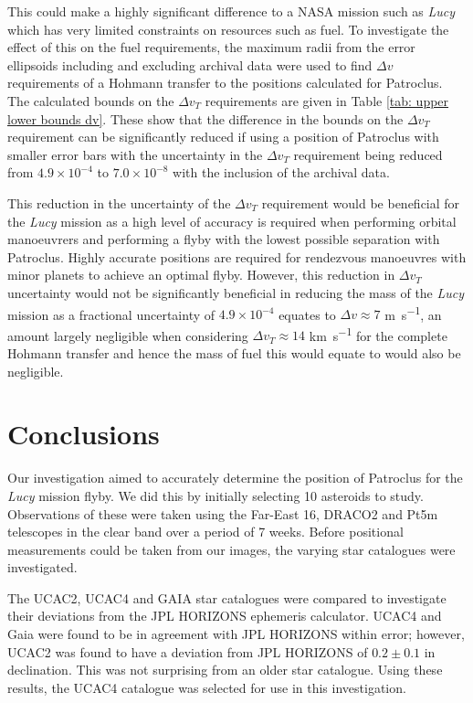 \documentclass[10pt, twocolumn]{revtex4}    %
\newcommand{\Lucy}{\textit{Lucy }}
\begin{document}
This could make a highly significant difference to a NASA mission such as \textit{Lucy} which has very limited constraints on resources such as fuel. To investigate the effect of this on the fuel requirements, the maximum radii from the error ellipsoids including and excluding archival data were used to find $\Delta v$ requirements of a Hohmann transfer to the positions calculated for Patroclus. The calculated bounds on the $\Delta v_{T}$ requirements are given in Table \ref{tab: upper lower bounds dv}. These show that the difference in the bounds on the $\Delta v_{T}$ requirement can be significantly reduced if using a position of Patroclus with smaller error bars with the uncertainty in the $\Delta v_{T}$ requirement being reduced from $4.9 \times 10^{-4}$ to $7.0 \times 10^{-8}$ with the inclusion of the archival data. 

This reduction in the uncertainty of the $\Delta v_{T}$ requirement would be beneficial for the \Lucy mission as a high level of accuracy is required when performing orbital manoeuvrers and performing a flyby with the lowest possible separation with Patroclus. Highly accurate positions are required for rendezvous manoeuvres with minor planets to achieve an optimal flyby. However, this reduction in $\Delta v_{T}$ uncertainty would not be significantly beneficial in reducing the mass of the \Lucy mission as a fractional uncertainty of $4.9 \times 10^{-4}$ equates to $\Delta v \approx 7$ \si{\metre\per\second}, an amount largely negligible when considering $\Delta v_{T} \approx 14$ \si{\km\per\s} for the complete Hohmann transfer and hence the mass of fuel this would equate to would also be negligible.

\section{Conclusions}

Our investigation aimed to accurately determine the position of Patroclus for the \Lucy mission flyby. We did this by initially selecting 10 asteroids to study. Observations of these were taken using the Far-East 16, DRACO2 and Pt5m telescopes in the clear band over a period of 7 weeks. Before positional measurements could be taken from our images, the varying star catalogues were investigated.

The UCAC2, UCAC4 and GAIA star catalogues were compared to investigate their deviations from the JPL HORIZONS ephemeris calculator. UCAC4 and Gaia were found to be in agreement with JPL HORIZONS within error; however, UCAC2 was found to have a deviation from JPL HORIZONS of $0.2 \pm 0.1$ in declination. This was not surprising from an older star catalogue. Using these results, the UCAC4 catalogue was selected for use in this investigation.
\end{document}
